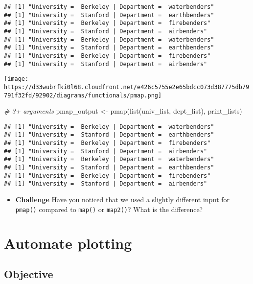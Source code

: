 \documentclass[
]{book}
\newenvironment{Shaded}{\begin{snugshade}}{\end{snugshade}}
\newcommand{\CommentTok}[1]{\textcolor[rgb]{0.56,0.35,0.01}{\textit{#1}}}
\newcommand{\FunctionTok}[1]{\textcolor[rgb]{0.00,0.00,0.00}{#1}}
\newcommand{\NormalTok}[1]{#1}
\newcommand{\OtherTok}[1]{\textcolor[rgb]{0.56,0.35,0.01}{#1}}
\providecommand{\tightlist}{%
  \setlength{\itemsep}{0pt}\setlength{\parskip}{0pt}}
\begin{document}
\begin{verbatim}
## [1] "University =  Berkeley | Department =  waterbenders"
## [1] "University =  Stanford | Department =  earthbenders"
## [1] "University =  Berkeley | Department =  firebenders"
## [1] "University =  Stanford | Department =  airbenders"
## [1] "University =  Berkeley | Department =  waterbenders"
## [1] "University =  Stanford | Department =  earthbenders"
## [1] "University =  Berkeley | Department =  firebenders"
## [1] "University =  Stanford | Department =  airbenders"
\end{verbatim}

\texttt{[image: https://d33wubrfki0l68.cloudfront.net/e426c5755e2e65bdcc073d387775db79791f32fd/92902/diagrams/functionals/pmap.png]}

\begin{Shaded}
\begin{Highlighting}[]
\CommentTok{\# 3+ arguments}
\NormalTok{pmap\_output }\OtherTok{\textless{}{-}} \FunctionTok{pmap}\NormalTok{(}\FunctionTok{list}\NormalTok{(univ\_list, dept\_list), print\_lists)}
\end{Highlighting}
\end{Shaded}

\begin{verbatim}
## [1] "University =  Berkeley | Department =  waterbenders"
## [1] "University =  Stanford | Department =  earthbenders"
## [1] "University =  Berkeley | Department =  firebenders"
## [1] "University =  Stanford | Department =  airbenders"
## [1] "University =  Berkeley | Department =  waterbenders"
## [1] "University =  Stanford | Department =  earthbenders"
## [1] "University =  Berkeley | Department =  firebenders"
## [1] "University =  Stanford | Department =  airbenders"
\end{verbatim}

\begin{itemize}
\tightlist
\item
  \textbf{Challenge} Have you noticed that we used a slightly different input for \texttt{pmap()} compared to \texttt{map()} or \texttt{map2()}? What is the difference?
\end{itemize}

\hypertarget{glue}{%
\section{Automate plotting}\label{glue}}

\hypertarget{objective}{%
\subsection{Objective}\label{objective}}
\end{document}
